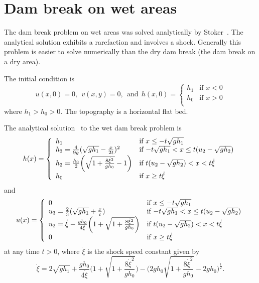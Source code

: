 
\section{Dam break on wet areas}

The dam break problem on wet areas was solved analytically by Stoker~\cite{Stoker1948, Stoker1957}. The analytical solution exhibits a rarefaction and involves a shock. Generally this problem is easier to solve numerically than the dry dam break (the dam break on a dry area).

The initial condition is
\begin{equation} \label{eq:dbp_init_wet}
u(x,0)=0, ~~v(x,y)=0, ~~\textrm{and}~~
h(x,0) = \left\{ \begin{array}{ll}
h_1 & \textrm{if $x < 0$}\\
h_0 & \textrm{if $x > 0$}\\
\end{array} \right.
\end{equation}
where $h_1>h_0>0$. The topography is a horizontal flat bed.

The analytical solution~\cite{Stoker1948, Stoker1957} to the wet dam break problem is
\begin{equation}
h(x) = \left\{ \begin{array}{ll}
h_1 & \textrm{if $x \leq -t \sqrt{gh_1}$}\\
h_3=\frac{4}{9g}(\sqrt{gh_1}-\frac{x}{2t})^2 & \textrm{if $-t \sqrt{gh_1} <x \leq t(u_2-\sqrt{gh_2}$})\\
h_2=\frac{h_0}{2}\bigg(\sqrt{1+\frac{8\dot{\xi}^2}{gh_0}}-1\bigg) & \textrm{if $ t(u_2-\sqrt{gh_2}) <x < t\dot{\xi}$}\\
h_0 & \textrm{if $x \geq t\dot{\xi}$}\\
\end{array} \right.
\end{equation}
and
\begin{equation}
u(x) = \left\{ \begin{array}{ll}
0 & \textrm{if $x \leq -t \sqrt{gh_1}$}\\
u_3=\frac{2}{3}(\sqrt{gh_1}+\frac{x}{t}) & \textrm{if $-t \sqrt{gh_1} <x \leq t(u_2-\sqrt{gh_2}$})\\
u_2=\dot{\xi}-\frac{gh_0}{4\dot{\xi}}\bigg(1+\sqrt{1+\frac{8\dot{\xi}^2}{gh_0}} \bigg) & \textrm{if $ t(u_2-\sqrt{gh_2}) <x < t\dot{\xi}$}\\
0 & \textrm{if $x \geq t\dot{\xi}$}\\
\end{array} \right.
\end{equation}
at any time $t>0$, where $\dot{\xi}$ is the shock speed constant given by 
\begin{equation} \label{eq:shock}
\dot{\xi}=2\sqrt{gh_1}+\frac{gh_0}{4\dot{\xi}}\bigg( 1+\sqrt{1+\frac{8\dot{\xi}^2}{gh_0}}\bigg)-\bigg( 2gh_0 \sqrt{1+\frac{8\dot{\xi}^2}{gh_0}}-2gh_0\bigg)^\frac{1}{2}.
\end{equation}


